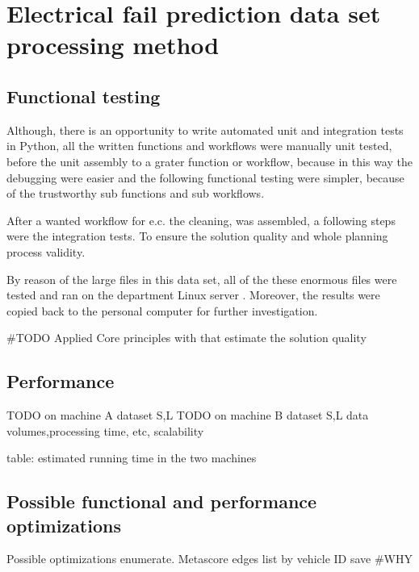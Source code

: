 \section{Electrical fail prediction data set processing method}
\subsection{Functional testing}
Although, there is an opportunity to write automated unit and integration tests in Python, all the written functions and workflows were manually unit tested, before the unit assembly to a grater function or workflow, because in this way the debugging were easier and the following functional testing were simpler, because of the trustworthy sub functions and sub workflows.

After a wanted workflow for e.c. the cleaning, was assembled, a following steps were the integration tests. To ensure the solution quality and whole planning process validity.

By reason of the large files in this data set, all of the these enormous files were tested and ran on the department Linux server \cite{Batman}.
Moreover, the results were copied back to the personal computer for further investigation.

\#TODO Applied Core principles with that estimate the solution quality
\subsection{Performance}

TODO on machine A dataset S,L
TODO on machine B dataset S,L
	data volumes,processing time, etc, scalability

table: estimated running time in the two machines
\subsection{Possible functional and performance optimizations}
Possible optimizations enumerate.
Metascore
edges list by vehicle ID save
\#WHY